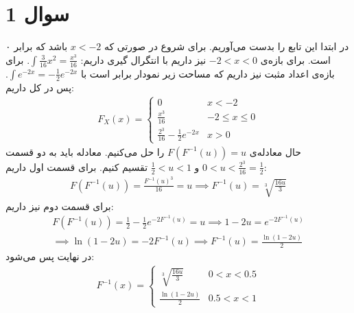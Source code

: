 \section*{سوال 1}
در ابتدا
این تابع را بدست می‌آوریم.
برای شروع در صورتی که
$x < -2$
باشد که
برابر ۰ است. برای بازه‌ی
$-2 < x < 0$
نیز داریم با انتگرال گیری داریم:
$\int \frac{3}{16}x^2 = \frac{x^3}{16}$.
برای بازه‌ی اعداد مثبت نیز داریم که مساحت زیر نمودار
برابر است با
$\int e^{-2x} = -\frac{1}{2} e^{-2x}$.
پس در کل داریم:
\begin{gather*}
    F_X(x) = \begin{cases}
        0  & x < -2 \\
        \frac{x^3}{16} & -2 \le x \le 0\\
        \frac{2^3}{16} - \frac{1}{2} e^{-2x} & x > 0
      \end{cases}
\end{gather*}
حال معادله‌ی $F(F^{-1}(u)) = u$ را حل می‌کنیم.
معادله باید به دو قسمت
$0 < u < \frac{2^3}{16} = \frac{1}{2}$ و $\frac{1}{2} < u < 1$
تقسیم کنیم. برای قسمت اول داریم:
\begin{gather*}
    F(F^{-1}(u)) = \frac{F^{-1}(u)^3}{16} = u \implies F^{-1}(u) = \sqrt[3]{\frac{16u}{3}}
\end{gather*}
برای قسمت دوم نیز داریم:
\begin{gather*}
    F(F^{-1}(u)) = \frac{1}{2} - \frac{1}{2} e^{-2F^{-1}(u)} = u \implies 1 - 2u = e^{-2F^{-1}(u)}\\
    \implies \ln(1 - 2u) = -2F^{-1}(u) \implies F^{-1}(u) = \frac{\ln(1 - 2u)}{2}
\end{gather*}
در نهایت پس می‌شود:
\begin{gather*}
    F^{-1}(x) = \begin{cases}
        \sqrt[3]{\frac{16u}{3}} & 0 < x < 0.5\\
        \frac{\ln(1 - 2u)}{2} & 0.5 < x < 1
      \end{cases}
\end{gather*}